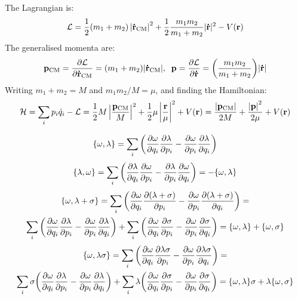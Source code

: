 \documentclass{report}
\theoremstyle{definition}
\begin{document}
\begin{chapter2}\label{prob: 8}
	The Lagrangian is:
		\begin{gather*}
			\mathcal{L} = \frac{1}{2}(m_1 + m_2)\left|{\bf \dot r_{\mathrm{CM}}}\right|^2 + \frac{1}{2}\frac{m_1 m_2}{m_1 + m_2}|{\bf \dot r}|^2 - V({\bf r})
		\end{gather*}
		The generalised momenta are:
		\begin{gather*}
			{\bf p_{\mathrm{CM}}} = \pdv{\mathcal{L}}{\bf \dot r_{\mathrm{CM}}} = (m_1 + m_2)|{\bf \dot r_{\mathrm{CM}}}|, \;\; {\bf p} = \pdv{\mathcal{L}}{\bf \dot r} = \pqty{\frac{m_1 m_2}{m_1 + m_2}}|{\bf \dot r}|
		\end{gather*}
		Writing $m_1 + m_2 = M$ and $m_1 m_2/M  = \mu$, and finding the Hamiltonian:
		\begin{gather*}
			\mathcal{H} = \sum_i p_i \dot{q}_i - \mathcal{L} = \frac{1}{2}M\left|\frac{{\bf p_{\mathrm{CM}}}}{M}\right|^2 + \frac{1}{2}\mu\left|\frac{{\bf r}}{\mu}\right|^2 + V({\bf r}) = \frac{\left|{\bf p_{\mathrm{CM}}}\right|}{2M} + \frac{\left|{\bf p}\right|^2}{2\mu} + V(\bf r) 
		\end{gather*}
\end{chapter2}

\begin{chapter2}\label{prob: 9}
	\begin{gather*}
			\acomm{\omega}{\lambda} = \sum_i \pqty{\pdv{\omega}{q_i}\pdv{\lambda}{p_i} - \pdv{\omega}{p_i}\pdv{\lambda}{q_i}}
		\end{gather*}
		\begin{gather*}
			\acomm{\lambda}{\omega} = \sum_i \pqty{\pdv{\lambda}{q_i}\pdv{\omega}{p_i} - \pdv{\lambda}{p_i}\pdv{\omega}{q_i} } = -\acomm{\omega}{\lambda}
		\end{gather*}
		\center{\rule{12cm}{0.4pt}}
		\begin{gather*}
			\acomm{\omega}{\lambda + \sigma} = \sum_i \pqty{\pdv{\omega}{q_i}\pdv{(\lambda + \sigma)}{p_i} - \pdv{\omega}{p_i}\pdv{(\lambda + \sigma)}{q_i}} = \\
			\sum_i \pqty{\pdv{\omega}{q_i} \pdv{\lambda}{p_i} - \pdv{\omega}{p_i}\pdv{\lambda}{q_i}} + \sum_i \pqty{\pdv{\omega}{q_i} \pdv{\sigma}{p_i} - \pdv{\omega}{p_i}\pdv{\sigma}{q_i}} = \acomm{\omega}{\lambda} + \acomm{\omega}{\sigma}
		\end{gather*}
		\center{\rule{12cm}{0.4pt}}
		\begin{gather*}
			\acomm{\omega}{\lambda\sigma} = \sum_i \pqty{\pdv{\omega}{q_i} \pdv{\lambda\sigma}{p_i} - \pdv{\omega}{p_i}\pdv{\lambda\sigma}{q_i}} = \\
			\sum_i \sigma\pqty{\pdv{\omega}{q_i} \pdv{\lambda}{p_i} - \pdv{\omega}{p_i}\pdv{\lambda}{q_i}} + \sum_i \lambda\pqty{\pdv{\omega}{q_i} \pdv{\sigma}{p_i} - \pdv{\omega}{p_i}\pdv{\sigma}{q_i}} = \acomm{\omega}{\lambda}\sigma + \lambda\acomm{\omega}{\sigma}
		\end{gather*}
		\center{\rule{12cm}{0.4pt}}

\end{chapter2}
\end{document}
